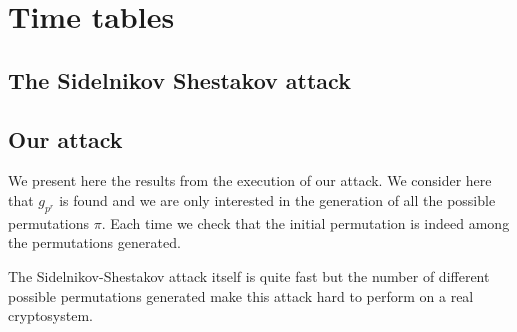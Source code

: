 \documentclass[a4paper]{article}
\begin{document}
\newpage
\section{Time tables}
\label{Sim:time}

\subsection{The Sidelnikov Shestakov attack}
\label{time:SS}

\begin{minipage}[H]{30cm}

\end{minipage}



\newpage
\subsection{Our attack}
\label{time:our}

We present here the results from the execution of our attack. We consider here that $g_{p^r}$ is found and we are only interested in the generation of all the possible permutations $\pi$. Each time we check that the initial permutation is indeed among the permutations generated.

The Sidelnikov-Shestakov attack itself is quite fast but the number of different possible permutations generated make this attack hard to perform on a real cryptosystem.


\begin{minipage}[H]{30cm}

\end{minipage}
\end{document}
